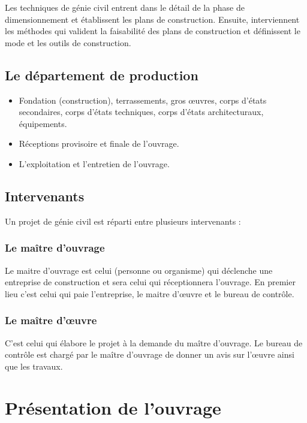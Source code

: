 \documentclass[12pt,a4paper]{report}
\numberwithin{equation}{section}
\begin{document}
	Les techniques de génie civil entrent dans le détail de la phase de dimensionnement et
	établissent les plans de construction. Ensuite, interviennent les méthodes qui valident la
	faisabilité des plans de construction et définissent le mode et les outils de construction.
	
	\subsection*{Le département de production}
	
	\begin{itemize}
		\item Fondation (construction), terrassements, gros œuvres, corps d'états secondaires, corps d'états techniques, corps d'états architecturaux, équipements.
		
		\item Réceptions provisoire et finale de l'ouvrage.
		
		\item L’exploitation et l'entretien de l'ouvrage.
	\end{itemize}
	
	\subsection*{Intervenants}
	
	Un projet de génie civil est réparti entre plusieurs intervenants :
	
	\subsubsection*{Le maître d'ouvrage}
	
	Le maitre d’ouvrage est celui (personne ou organisme) qui déclenche une entreprise de construction et sera celui qui réceptionnera l'ouvrage. En premier lieu c'est celui qui paie l'entreprise, le maitre d'œuvre et le bureau de contrôle.
	
	
	\subsubsection*{Le maître d'œuvre}
	
	C’est celui qui élabore le projet à la demande du maître d'ouvrage. Le bureau de contrôle est chargé par le maître d'ouvrage de donner un avis sur l'œuvre ainsi que les travaux.
	
	



	\section{Présentation de l'ouvrage}
	
\end{document}
